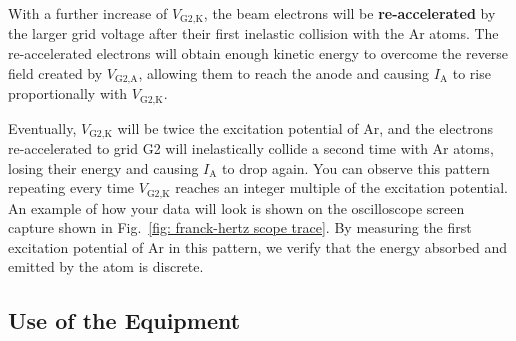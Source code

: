 \documentclass[addpoints]{physlabs} %
\begin{document}
\begin{labsection}
\begin{experiment}
    With a further increase of $V_\text{G2,K}$, the beam electrons will be {\bf re-accelerated} by the larger grid voltage after their first inelastic collision with the Ar atoms. The re-accelerated electrons will obtain enough kinetic energy to overcome the reverse field created by $V_\text{G2,A}$, allowing them to reach the anode and causing $I_\text{A}$ to rise proportionally with $V_\text{G2,K}$.
    
    Eventually, $V_\text{G2,K}$ will be twice the excitation potential of Ar, and the electrons re-accelerated to grid G2 will inelastically collide a second time with Ar atoms, losing their energy and causing $I_\text{A}$ to drop again. You can observe this pattern repeating every time $V_\text{G2,K}$ reaches an integer multiple of the excitation potential. An example of how your data will look is shown on the oscilloscope screen capture shown in Fig.~\ref{fig: franck-hertz scope trace}. By measuring the first excitation potential of Ar in this pattern, we verify that the energy absorbed and emitted by the atom is discrete.
    
    \subsection*{Use of the Equipment}
    
    \begin{center}
    \setlength{\fboxsep}{6pt}%
    \setlength{\fboxrule}{2pt}%
    \end{center}
    

\end{experiment}
\end{labsection}
\end{document}
